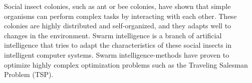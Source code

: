 
Social insect colonies, such as ant or bee colonies, have shown that simple organisms can perform complex tasks by interacting with each other. These colonies are highly distributed and self-organized, and they adapts well to changes in the environment. Swarm intelligence \citep{swarmintelligence} is a branch of artificial intelligence that tries to adapt the characteristics of these social insects in intelligent computer systems. Swarm intelligence-methods have proven to optimize highly complex optimization problems such as the Traveling Salesman Problem (TSP). 